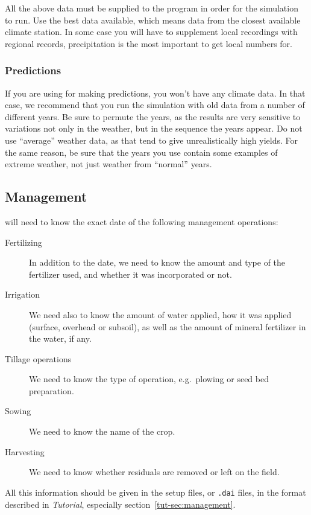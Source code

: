 \documentclass[a4paper,11pt,twoside]{article}
\newcommand{\daisytut}{\textit{\Daisy{} Tutorial}}
\begin{document}
All the above data must be supplied to the program in order for the
simulation to run.  Use the best data available, which means data from
the closest available climate station.  In some case you will have to
supplement local recordings with regional records, precipitation is
the most important to get local numbers for.

\subsubsection{Predictions}

If you are using \daisy{} for making predictions, you won't have any
climate data.  In that case, we recommend that you run the simulation
with old data from a number of different years.  Be sure to permute
the years, as the results are very sensitive to variations not only in
the weather, but in the sequence the years appear.  Do not use
``average'' weather data, as that tend to give unrealistically high
yields.  For the same reason, be sure that the years you use contain
some examples of extreme weather, not just weather from ``normal''
years.

\subsection{Management}

\Daisy{} will need to know the exact date of the following management
operations:
\begin{description}
\item[Fertilizing] In addition to the date, we need to know the amount
  and type of the fertilizer used, and whether it was incorporated or
  not.
\item[Irrigation] We need also to know the amount of water applied,
  how it was applied (surface, overhead or subsoil), as well as the
  amount of mineral fertilizer in the water, if any.
\item[Tillage operations] We need to know the type of operation, e.g.\ 
  plowing or seed bed preparation.
\item[Sowing]  We need to know the name of the crop.
\item[Harvesting] We need to know whether residuals are removed or
  left on the field.
\end{description}

All this information should be given in the \daisy{} setup files, or
\texttt{.dai} files, in the format described in \daisytut{},
especially section~\ref{tut-sec:management}.
\end{document}
